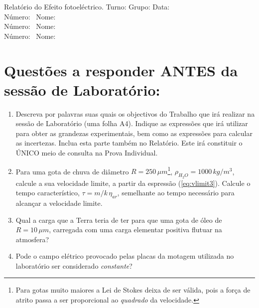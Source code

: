 \documentclass[a4paper,12pt]{article}  %
\author{Prof. Bernardo B. Carvalho}
\date{ Outubro 2014}
\newcommand{\HRule}{\rule{\linewidth}{0.5mm}}
\begin{document}
 



{  \sf  Relatório do Efeito fotoeléctrico.} %
Turno:\underline{\makebox[0.7cm][l]{~}} Grupo:\underline{\makebox[0.7cm][l]{~}} Data:\underline{\makebox[2cm][l]{~}}\\
\noindent Número:~\underline{\makebox[2cm][r]{~}} Nome:~\underline{\makebox[10cm][r]{~}} \\
\noindent Número:~\underline{\makebox[2cm][r]{~}} Nome:~\underline{\makebox[10cm][r]{~}} \\
\noindent Número:~\underline{\makebox[2cm][r]{~}} Nome:~\underline{\makebox[10cm][r]{~}} 


\section{\sf Questões a responder ANTES da sessão de Laboratório:}
\begin{enumerate}
\item Descreva por palavras suas quais os objectivos do Trabalho que irá realizar na sessão de Laboratório (uma folha A4). 
Indique as expressões que irá utilizar para obter as grandezas experimentais, bem como as expressões para calcular as incertezas. Inclua esta parte também no Relatório. Este irá constituir o ÚNICO meio de consulta na Prova Individual.

\item Para uma gota de chuva de diâmetro $R = 250\,\mu m$\footnote{Para gotas muito maiores a Lei de Stokes deixa de ser válida, pois a força de atrito passa a ser proporcional ao \emph{quadrado} da velocidade.}, $\rho_{H_2 O} = 1000 \, kg/m^{3}$, calcule a sua velocidade limite, a partir da espressão (\ref{eq:vlimit3}). Calcule o tempo característico, $\tau=m/k\,\eta_{ar}$, semelhante ao tempo necessário para alcançar a velocidade limite.
\item Qual a carga que a Terra teria de ter para que uma gota de óleo de $R = 10\,\mu m$, carregada com uma carga elementar positiva flutuar na atmosfera?
\item Pode o campo elétrico provocado pelas placas da motagem utilizada no laboratório ser considerado \emph{constante}?
\end{enumerate}
\end{document}
